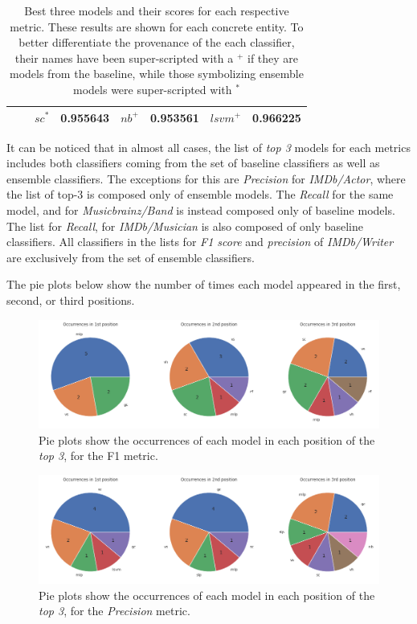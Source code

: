\documentclass[epsfig,a4paper,11pt,titlepage,twoside,openany]{book}
\begin{document}
\begin{table}[H]
\begin{tabular}{|l|l|ll|ll|ll|}
                             &                           & $sc^*$    & 0.955643 & $nb^+$    & 0.953561  & $lsvm^+$                 & 0.966225    \\ \hline
\end{tabular}
\caption{Best three models and their scores for each respective metric. These results are shown for each concrete entity. To better differentiate the provenance of the each classifier, their names have been super-scripted with a $^+$ if they are models from the baseline, while those symbolizing ensemble models were super-scripted with $^*$}
\label{tab:comparison-bl-ens-top-3}
\end{table}


It can be noticed that in almost all cases, the list of \textit{top 3} models for each metrics includes both classifiers coming from the set of baseline classifiers as well as ensemble classifiers. The exceptions for this are \textit{Precision} for \textit{IMDb/Actor}, where the list of top-3 is composed only of ensemble models. The \textit{Recall} for the same model, and for \textit{Musicbrainz/Band} is instead composed only of baseline models. The list for \textit{Recall}, for \textit{IMDb/Musician} is also composed of only baseline classifiers. All classifiers in the lists for \textit{F1 score} and \textit{precision} of \textit{IMDb/Writer} are exclusively from the set of ensemble classifiers.

The pie plots below show the number of times each model appeared in the first, second, or third positions. 

\begin{figure}[H]
  \centering \includegraphics[width=\textwidth]{comparison_f1_top_spaces_pies} 
  \caption{Pie plots show the occurrences of each model in each position of the \textit{top 3}, for the F1 metric.}
  \label{fig:comparison-pie-occurrences-f1}
\end{figure}

\begin{figure}[H]
  \centering \includegraphics[width=\textwidth]{comparison_prec_top_spaces_pies} 
  \caption{Pie plots show the occurrences of each model in each position of the \textit{top 3}, for the \textit{Precision} metric.}
  \label{fig:comparison-pie-occurrences-precision}
\end{figure}
\end{document}
